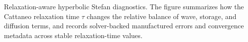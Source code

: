 \caption{Relaxation-aware hyperbolic Stefan diagnostics. The figure summarizes how the Cattaneo relaxation time $\tau$ changes the relative balance of wave, storage, and diffusion terms, and records solver-backed manufactured errors and convergence metadata across stable relaxation-time values.}
\label{fig:direction-c-relaxation-balance}
